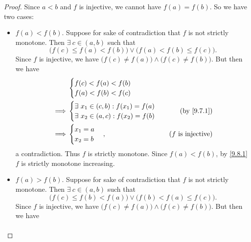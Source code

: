 \begin{proof}
  Since \(a < b\) and \(f\) is injective, we cannot have \(f(a) = f(b)\).
  So we have two cases:
  \begin{itemize}
    \item \(f(a) < f(b)\).
          Suppose for sake of contradiction that \(f\) is not strictly monotone.
          Then \(\exists\ c \in (a, b)\) such that
          \[
            \big(f(c) \leq f(a) < f(b)\big) \lor \big(f(a) < f(b) \leq f(c)\big).
          \]
          Since \(f\) is injective, we have \(\big(f(c) \neq f(a)\big) \land \big(f(c) \neq f(b)\big)\).
          But then we have
          \begin{align*}
                     & \begin{cases}
                         f(c) < f(a) < f(b) \\
                         f(a) < f(b) < f(c)
                       \end{cases}                                                      \\
            \implies & \begin{cases}
                         \exists\ x_1 \in (c, b) : f(x_1) = f(a) \\
                         \exists\ x_2 \in (a, c) : f(x_2) = f(b) \\
                       \end{cases} & \text{(by \cref{9.7.1})}                                 \\
            \implies & \begin{cases}
                         x_1 = a \\
                         x_2 = b
                       \end{cases},                              & \text{(\(f\) is injective)}
          \end{align*}
          a contradiction.
          Thus \(f\) is strictly monotone.
          Since \(f(a) < f(b)\), by \cref{9.8.1} \(f\) is strictly monotone increasing.
    \item \(f(a) > f(b)\).
          Suppose for sake of contradiction that \(f\) is not strictly monotone.
          Then \(\exists\ c \in (a, b)\) such that
          \[
            \big(f(c) \leq f(b) < f(a)\big) \lor \big(f(b) < f(a) \leq f(c)\big).
          \]
          Since \(f\) is injective, we have \(\big(f(c) \neq f(a)\big) \land \big(f(c) \neq f(b)\big)\).
          But then we have
          \begin{align*}

\end{align*}
\end{itemize}
\end{proof}

